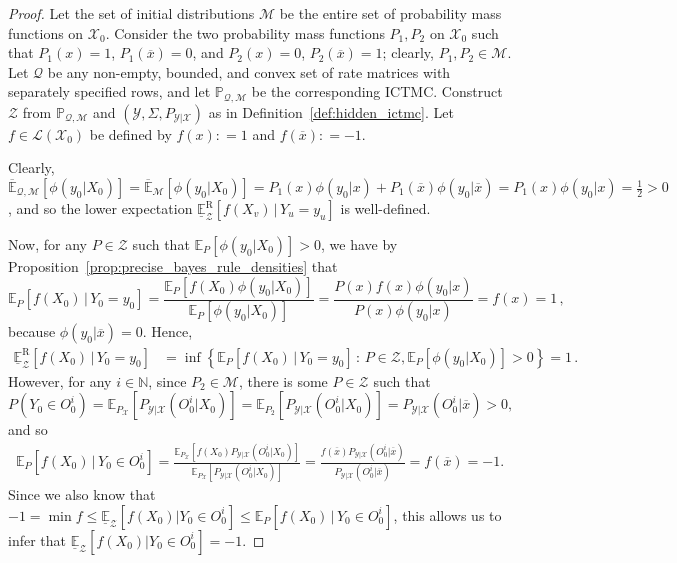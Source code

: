 \documentclass[twoside,11pt]{article}
\newcommand{\nats}{\mathbb{N}}
\newcommand{\states}{\mathcal{X}}
\newcommand{\observs}{\mathcal{Y}}
\newcommand{\uexp}{\overline{\mathbb{E}}_{\rateset,\mathcal{M}}}
\newcommand{\gambles}{\mathcal{L}}
\newcommand{\rateset}{\mathcal{Q}}
\newcommand{\coloneqq}{:\!=}
\begin{document}
\begin{proof}
Let the set of initial distributions $\mathcal{M}$ be the entire set of probability mass functions on $\states_0$. Consider the two probability mass functions $P_1,P_2$ on $\states_0$ such that $P_1(x)=1$, $P_1(\overline{x})=0$, and $P_2(x)=0$, $P_2(\overline{x})=1$; clearly, $P_1,P_2\in\mathcal{M}$. Let $\rateset$ be any non-empty, bounded, and convex set of rate matrices with separately specified rows, and let $\mathbb{P}_{\rateset,\mathcal{M}}$ be the corresponding ICTMC. Construct $\mathcal{Z}$ from $\mathbb{P}_{\rateset,\mathcal{M}}$ and $(\observs,\Sigma,P_{\observs\vert\states})$ as in Definition~\ref{def:hidden_ictmc}. Let $f\in\gambles(\states_0)$ be defined by $f(x)\coloneqq 1$ and $f(\overline{x})\coloneqq -1$. 

Clearly, $\uexp[\phi(y_0\vert X_0)]=\overline{\mathbb{E}}_\mathcal{M}[\phi(y_0\vert X_0)] = P_1(x)\phi(y_0\vert x) + P_1(\overline{x})\phi(y_0\vert \overline{x})=P_1(x)\phi(y_0\vert x) = \frac{1}{2}>0$, and so the lower expectation $\underline{\mathbb{E}}_\mathcal{Z}^\mathrm{R}[f(X_v)\,\vert\, Y_u=y_u]$ is well-defined.

Now, for any $P\in\mathcal{Z}$ such that $\mathbb{E}_{P}[\phi(y_0\vert X_0)]>0$, we have by Proposition~\ref{prop:precise_bayes_rule_densities} that
\begin{equation*}
\mathbb{E}_{P}[f(X_0)\,\vert\,Y_0=y_0] = \frac{\mathbb{E}_{P}[f(X_0)\phi(y_0\vert X_0)]}{\mathbb{E}_{P}[\phi(y_0\vert X_0)]} = \frac{P(x)f(x)\phi(y_0\vert x)}{P(x)\phi(y_0\vert x)} = f(x) = 1\,,
\end{equation*}
because $\phi(y_0\vert \overline{x})=0$. Hence,
\begin{align*}
\underline{\mathbb{E}}_\mathcal{Z}^\mathrm{R}[f(X_0)\,\vert\, Y_0=y_0] &= \inf\left\{ \mathbb{E}_{P}[f(X_0)\,\vert\,Y_0=y_0]\,:\,P\in\mathcal{Z}, \mathbb{E}_{P}[\phi(y_0\vert X_0)]>0  \right\} = 1\,.
\end{align*}
However, for any $i\in\nats$, since $P_2\in\mathcal{M}$, there is some $P\in\mathcal{Z}$ such that 
\begin{equation*}
P(Y_0\in O_0^i)=\mathbb{E}_{P_\states}[P_{\observs\vert\states}(O_0^i\vert X_0)]=\mathbb{E}_{P_2}[P_{\observs\vert\states}(O_0^i\vert X_0)]=P_{\observs\vert\states}(O_0^i\vert \overline{x})>0,
\end{equation*}
and so
\begin{align*}
\mathbb{E}_{P}[f(X_0)\,\vert\,Y_0\in O_0^i] = \frac{\mathbb{E}_{P_\states}[f(X_0)P_{\observs\vert\states}(O_0^i\vert X_0)]}{\mathbb{E}_{P_\states}[P_{\observs\vert\states}(O_0^i\vert X_0)]} = \frac{f(\overline{x})P_{\observs\vert\states}(O_0^i\vert \overline{x})}{P_{\observs\vert\states}(O_0^i\vert \overline{x})} = f(\overline{x}) = -1.
\end{align*}
Since we also know that $-1=\min f \leq \underline{\mathbb{E}}_\mathcal{Z}[f(X_0)\vert Y_0\in O_0^i] \leq \mathbb{E}_{P}[f(X_0)\,\vert\,Y_0\in O_0^i]$, this allows us to infer that $\underline{\mathbb{E}}_\mathcal{Z}[f(X_0)\vert Y_0\in O_0^i]=-1$.


\end{proof}
\end{document}
